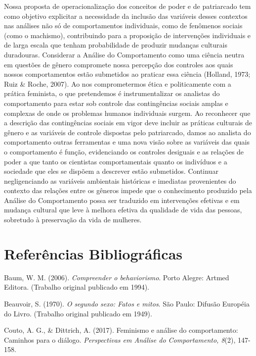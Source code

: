 Nossa proposta de operacionalização dos conceitos de poder e de patriarcado tem como objetivo explicitar a necessidade da inclusão das variáveis desses contextos nas análises não só de comportamentos individuais, como de fenômenos sociais (como o machismo), contribuindo para a proposição de intervenções individuais e de larga escala que tenham probabilidade de produzir mudanças culturais duradouras. Considerar a Análise do Comportamento como uma ciência neutra em questões de gênero compromete nossa percepção dos controles aos quais nossos comportamentos estão submetidos ao praticar essa ciência (Holland, 1973; Ruiz \& Roche, 2007). Ao nos comprometermos ética e politicamente com a prática feminista, o que pretendemos é instrumentalizar os analistas do comportamento para estar sob controle das contingências sociais amplas e complexas de onde os problemas humanos individuais surgem. Ao reconhecer que a descrição das contingências sociais em vigor deve incluir as práticas culturais de gênero e as variáveis de controle dispostas pelo patriarcado, damos ao analista do comportamento outras ferramentas e uma nova visão sobre as variáveis das quais o comportamento é função, evidenciando os controles desiguais e as relações de poder a que tanto os cientistas comportamentais quanto os indivíduos e a sociedade que eles se dispõem a descrever estão submetidos. Continuar negligenciando as variáveis ambientais históricas e imediatas provenientes do contexto das relações entre os gêneros impede que o conhecimento produzido pela Análise do Comportamento possa ser traduzido em intervenções efetivas e em mudança cultural que leve à melhora efetiva da qualidade de vida das pessoas, sobretudo à preservação da vida de mulheres.

\section*{Referências Bibliográficas}

\hangindent=25pt
\noindent Baum, W. M. (2006). \textit{Compreender o behaviorismo}. Porto Alegre: Artmed Editora. (Trabalho original publicado em 1994).

\hangindent=25pt
\noindent Beauvoir, S. (1970). \textit{O segundo sexo: Fatos e mitos}. São Paulo: Difusão Européia do Livro. (Trabalho original publicado em 1949).

\hangindent=25pt
\noindent Couto, A. G., \& Dittrich, A. (2017). Feminismo e análise do comportamento: Caminhos para o diálogo. \textit{Perspectivas em Análise do Comportamento, 8}(2), 147-158.

